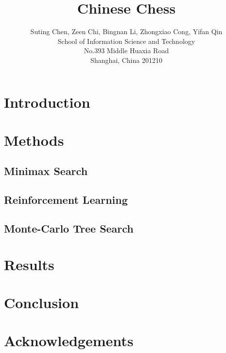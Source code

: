 \documentclass[letterpaper]{article}
\title{Chinese Chess}
\author{Suting Chen, Zeen Chi, Bingnan Li, Zhongxiao Cong, Yifan Qin\\
School of Information Science and Technology\\
No.393 Middle Huaxia Road\\
Shanghai, China 201210\\
}
\begin{document}
\maketitle
\begin{abstract}
\begin{quote}

\end{quote}
\end{abstract}

\section{Introduction}\label{sec:introduction}


\section{Methods}\label{sec:methods}

\subsection{Minimax Search}\label{subsec:minimax-search}

\subsection{Reinforcement Learning}\label{subsec:reinforcement-learning}

\subsection{Monte-Carlo Tree Search}\label{subsec:monte-carlo-tree-search}


\section{Results}\label{sec:results}


\section{Conclusion}\label{sec:conclusion}


\section{Acknowledgements}\label{sec:acknowledgements}
\end{document}
